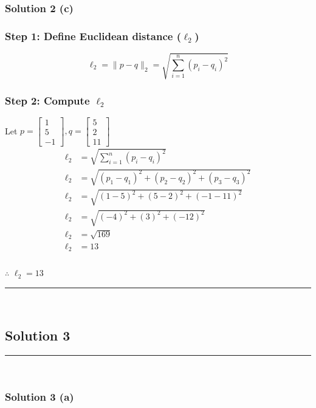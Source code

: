 \documentclass{article}
\begin{document}
\subsubsection*{Solution 2 (c)}
\subsubsection*{Step 1: Define Euclidean distance ($\ell_2$)}
\parbox{\textwidth}{

$$\ell_2 = \|p - q\|_2 = \sqrt{\sum_{i=1}^{n} (p_i - q_i)^2}$$

}

\subsubsection*{Step 2: Compute $\ell_2$}
\parbox{\textwidth}{
Let $p = \begin{bmatrix} 1 \\ 5 \\ -1 \end{bmatrix}, q = \begin{bmatrix} 5 \\ 2 \\ 11 \end{bmatrix}$
$$
\begin{aligned}
\ell_2 &= \sqrt{\sum_{i=1}^{n} (p_i - q_i)^2}\\
\ell_2 &= \sqrt{(p_1 - q_1)^{2}+(p_2 - q_2)^{2}+(p_3 - q_3)^{2}}\\
\ell_2 &= \sqrt{(1 - 5)^{2}+(5 - 2)^{2}+(-1 - 11)^{2}}\\
\ell_2 &= \sqrt{(-4)^{2}+(3)^{2}+(-12)^{2}}\\
\ell_2 &= \sqrt{169}\\
\ell_2 &= 13
\end{aligned}
$$
}
\subsubsection*{\normalfont}{$\therefore$ $\ell_{2} = 13$}

\noindent\rule{\textwidth}{0.4pt}\\

\newpage

\subsection*{Solution 3}
\noindent\rule{\textwidth}{0.4pt}\\
\subsubsection*{Solution 3 (a)}
\end{document}
